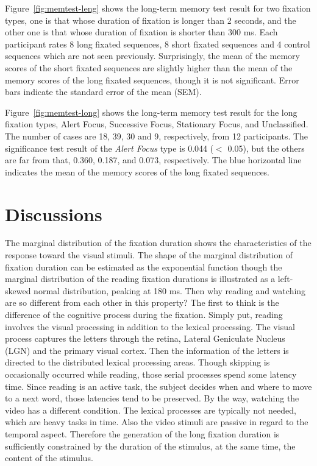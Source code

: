 \documentclass[10pt,letterpaper]{article}
\begin{document}
Figure~\ref{fig:memtest-leng} shows the long-term memory test result for two fixation types, one is that whose duration of fixation is longer than 2 seconds, and the other one is that whose duration of fixation is shorter than 300 ms. Each participant rates 8 long fixated sequences, 8 short fixated sequences and 4 control sequences which are not seen previously. Surprisingly, the mean of the memory scores of the short fixated sequences are slightly higher than the mean of the memory scores of the long fixated sequences, though it is not significant. Error bars indicate the standard error of the mean (SEM).

Figure~\ref{fig:memtest-long} shows the long-term memory test result for the long fixation types, Alert Focus, Successive Focus, Stationary Focus, and Unclassified. The number of cases are 18, 39, 30 and 9, respectively, from 12 participants. The significance test result of the \textit{Alert Focus} type is 0.044 ($<$ 0.05), but the others are far from that, 0.360, 0.187, and 0.073, respectively. The blue horizontal line indicates the mean of the memory scores of the long fixated sequences.


\section{Discussions}

The marginal distribution of the fixation duration shows the characteristics of the response toward the visual stimuli. The shape of the marginal distribution of fixation duration can be estimated as the exponential function though the marginal distribution of the reading fixation durations is illustrated as a left-skewed normal distribution, peaking at 180 ms. Then why reading and watching are so different from each other in this property? The first to think is the difference of the cognitive process during the fixation. Simply put, reading involves the visual processing in addition to the lexical processing. The visual process captures the letters through the retina, Lateral Geniculate Nucleus (LGN) and the primary visual cortex. Then the information of the letters is directed to the distributed lexical processing areas. Though skipping is occasionally occurred while reading, those serial processes spend some latency time. Since reading is an active task, the subject decides when and where to move to a next word, those latencies tend to be preserved. By the way, watching the video has a different condition. The lexical processes are typically not needed, which are heavy tasks in time. Also the video stimuli are passive in regard to the temporal aspect. Therefore the generation of the long fixation duration is sufficiently constrained by the duration of the stimulus, at the same time, the content of the stimulus. 
\end{document}
